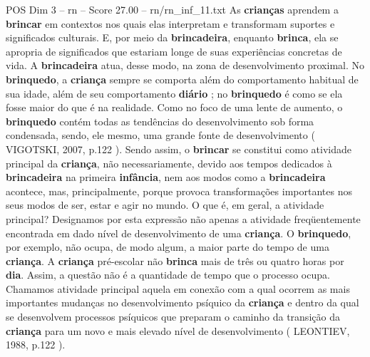 \begin{textsample}{POS Dim 3 – rn – Score 27.00 – rn/rn\_inf\_11.txt}
As \textbf{crianças} aprendem a \textbf{brincar} em contextos nos quais elas interpretam e transformam suportes e significados culturais.
E, por meio da \textbf{brincadeira}, enquanto \textbf{brinca}, ela se apropria de significados que estariam longe de suas experiências concretas de vida.
A \textbf{brincadeira} atua, desse modo, na zona de desenvolvimento proximal.
No \textbf{brinquedo}, a \textbf{criança} sempre se comporta além do comportamento habitual de sua idade, além de seu comportamento \textbf{diário} ; no \textbf{brinquedo} é como se ela fosse maior do que é na realidade.
Como no foco de uma lente de aumento, o \textbf{brinquedo} contém todas as tendências do desenvolvimento sob forma condensada, sendo, ele mesmo, uma grande fonte de desenvolvimento ( VIGOTSKI, 2007, p.122 ).
Sendo assim, o \textbf{brincar} se constitui como atividade principal da \textbf{criança}, não necessariamente, devido aos tempos dedicados à \textbf{brincadeira} na primeira \textbf{infância}, nem aos modos como a \textbf{brincadeira} acontece, mas, principalmente, porque provoca transformações importantes nos seus modos de ser, estar e agir no mundo.
O que é, em geral, a atividade principal?
Designamos por esta expressão não apenas a atividade freqüentemente encontrada em dado nível de desenvolvimento de uma \textbf{criança}.
O \textbf{brinquedo}, por exemplo, não ocupa, de modo algum, a maior parte do tempo de uma \textbf{criança}.
A \textbf{criança} pré-escolar não \textbf{brinca} mais de três ou quatro horas por \textbf{dia}.
Assim, a questão não é a quantidade de tempo que o processo ocupa.
Chamamos atividade principal aquela em conexão com a qual ocorrem as mais importantes mudanças no desenvolvimento psíquico da \textbf{criança} e dentro da qual se desenvolvem processos psíquicos que preparam o caminho da transição da \textbf{criança} para um novo e mais elevado nível de desenvolvimento ( LEONTIEV, 1988, p.122 ).

\end{textsample}
